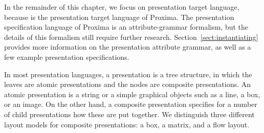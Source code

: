 In the remainder of this chapter, we focus on presentation target language, because {\Xprez} is the presentation target language of Proxima. The presentation specification language of Proxima is an attribute-grammar formalism, but the details of this formalism still require further research. Section~\ref{sect:instantiating} provides more information on the presentation attribute grammar, as well as a few example presentation specifications. 

In most presentation languages, a presentation is a tree structure, in which the leaves are atomic presentations and the nodes are composite presentations. An atomic presentation is a string or a simple graphical objects such as a line, a box, or an image. On the other hand, a composite presentation specifies for a number of child presentations how these are put together. We distinguish three different layout models for composite presentations: a box, a matrix, and a flow layout.

